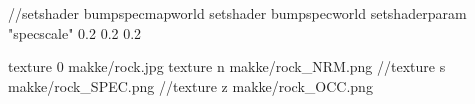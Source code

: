 //setshader bumpspecmapworld
setshader bumpspecworld
setshaderparam "specscale" 0.2 0.2 0.2

texture 0 makke/rock.jpg
texture n makke/rock_NRM.png
//texture s makke/rock_SPEC.png
//texture z makke/rock_OCC.png

